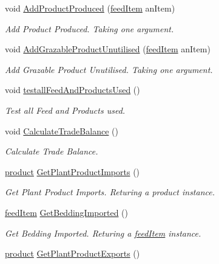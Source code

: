\begin{DoxyCompactItemize}
void \mbox{\hyperlink{class_global_vars_ab82efa871de33736324f919209f89c46}{Add\+Product\+Produced}} (\mbox{\hyperlink{classfeed_item}{feed\+Item}} an\+Item)
\begin{DoxyCompactList}\small\item\em Add Product Produced. Taking one argument. \end{DoxyCompactList}\item 
void \mbox{\hyperlink{class_global_vars_ab89dab6808de1b3cf7dea479146f6865}{Add\+Grazable\+Product\+Unutilised}} (\mbox{\hyperlink{classfeed_item}{feed\+Item}} an\+Item)
\begin{DoxyCompactList}\small\item\em Add Grazable Product Unutilised. Taking one argument. \end{DoxyCompactList}\item 
void \mbox{\hyperlink{class_global_vars_af6defb06d764d2316cbb4e964265a4b9}{testall\+Feed\+And\+Products\+Used}} ()
\begin{DoxyCompactList}\small\item\em Test all Feed and Products used. \end{DoxyCompactList}\item 
void \mbox{\hyperlink{class_global_vars_a8829945aaadcc14efa19328c512c3a43}{Calculate\+Trade\+Balance}} ()
\begin{DoxyCompactList}\small\item\em Calculate Trade Balance. \end{DoxyCompactList}\item 
\mbox{\hyperlink{class_global_vars_1_1product}{product}} \mbox{\hyperlink{class_global_vars_a460ab7fc30f0bfd0ac2f70da9773c661}{Get\+Plant\+Product\+Imports}} ()
\begin{DoxyCompactList}\small\item\em Get Plant Product Imports. Returing a product instance. \end{DoxyCompactList}\item 
\mbox{\hyperlink{classfeed_item}{feed\+Item}} \mbox{\hyperlink{class_global_vars_a092e7eeb7bece400396938d44551a9f5}{Get\+Bedding\+Imported}} ()
\begin{DoxyCompactList}\small\item\em Get Bedding Imported. Returing a \mbox{\hyperlink{classfeed_item}{feed\+Item}} instance. \end{DoxyCompactList}\item 
\mbox{\hyperlink{class_global_vars_1_1product}{product}} \mbox{\hyperlink{class_global_vars_a97b9869100615c2e3b3fc5c48e10080f}{Get\+Plant\+Product\+Exports}} ()

\end{DoxyCompactItemize}
